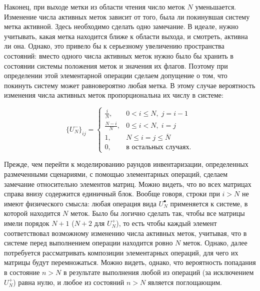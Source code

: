 Наконец, при выходе метки из области чтения число меток $N$ уменьшается. Изменение числа активных меток зависит от того, была ли покинувшая систему метка активной. Здесь необходимо сделать одно замечание. В идеале, нужно учитывать, какая метка находится ближе к области выхода, и смотреть, активна ли она. Однако, это привело бы к серьезному увеличению пространства состояний: вместо одного числа активных меток нужно было бы хранить в состоянии системы положения меток и значения их флагов. Поэтому при определении этой элементарной операции сделаем допущение о том, что покинуть систему может равновероятно любая метка. В этому случае вероятность изменения числа активных меток пропорциональна их числу в системе:

\begin{equation}\label{eq:ch3_bg_tag_departure}
	\{ U_{N}^- \}_{ij} = \begin{cases}
		\frac{i}{N},     & 0 < i \leqslant N,\; j = i - 1\\
		\frac{N - i}{N}, & 0 \leqslant i < N,\; i = j\\
		1,               & N \leqslant i = j \leqslant \overline{N}\\
		0,               & \text{в остальных случаях.}
 	\end{cases}
\end{equation}

Прежде, чем перейти к моделированию раундов инвентаризации, определенных размеченными сценариями, с помощью элементарных операций, сделаем замечание относительно элементов матриц. Можно видеть, что во всех матрицах справа внизу содержится единичный блок. Вообще говоря, строки при $i > N$ не имеют физического смысла: любая операция вида $U^\bullet_N$ применяется к системе, в которой находится $N$ меток. Было бы логично сделать так, чтобы все матрицы имели порядок $N+1$ ($N+2$ для $U_N^+$), то есть чтобы каждый элемент соответствовал возможному изменению числа активных меток, учитывая, что в системе перед выполнением операции находится ровно $N$ меток. Однако, далее потребуется рассматривать композиции элементарных операций, для чего их матрицы будут перемножаться. Можно видеть, однако, что вероятность попадания в состояние $n > N$ в результате выполнения любой из операций (за исключением $U_N^+$) равна нулю, и любое из состояний $n > N$ является поглощающим.




